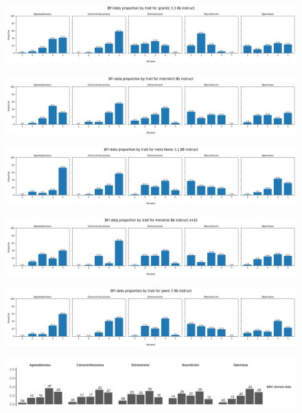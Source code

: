 \documentclass{article}
\begin{document}
\begin{figure}[H]
    \centering
    \includegraphics[width=0.7 \linewidth]{../Prompt_code/plots/granite-3.3-8b-instruct/bfi_distribution.png}
\end{figure}

\begin{figure}[H]
    \centering
    \includegraphics[width=0.7 \linewidth]{../Prompt_code/plots/internlm3-8b-instruct/bfi_distribution.png}
\end{figure}

\begin{figure}[H]
    \centering
    \includegraphics[width=0.7 \linewidth]{../Prompt_code/plots/meta-llama-3.1-8B-instruct/bfi_distribution.png}
\end{figure}

\begin{figure}[H]
    \centering
    \includegraphics[width=0.7 \linewidth]{../Prompt_code/plots/ministral-8b-instruct-2410/bfi_distribution.png}
\end{figure}

\begin{figure}[H]
    \centering
    \includegraphics[width=0.7 \linewidth]{../Prompt_code/plots/qwen-3-8b-instruct/bfi_distribution.png}
\end{figure}

\begin{figure}[H]
    \centering
    \includegraphics[width=0.7 \linewidth]{./article_data/human_distr.png}
\end{figure}
\end{document}

